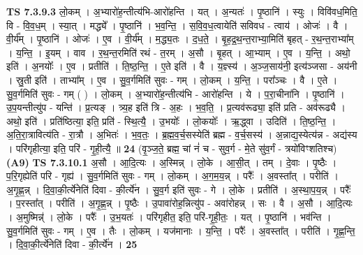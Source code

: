 \documentclass[17pt]{extarticle}
\begin{document}
                  \newline
                                \textbf{ TS 7.3.9.3} \newline
                  लो॒कम् । अ॒भ्यारो॑ह॒न्तीत्य॑भि-आरो॑हन्ति । यत् । अ॒न्यतः॑ । पृ॒ष्ठानि॑ । स्युः । विवि॑वध॒मिति॒ वि - वि॒व॒ध॒म् । स्या॒त् । मद्ध्ये᳚ । पृ॒ष्ठानि॑ । भ॒व॒न्ति॒ । स॒वि॒व॒ध॒त्वायेति॑ सविवध - त्वाय॑ । ओजः॑ । वै । वी॒र्य᳚म् । पृ॒ष्ठानि॑ । ओजः॑ । ए॒व । वी॒र्य᳚म् । म॒द्ध्य॒तः । द॒ध॒ते॒ । बृ॒ह॒द्र॒थ॒न्त॒राभ्या॒मिति॑ बृहत् - र॒थ॒न्त॒राभ्या᳚म् । य॒न्ति॒ । इ॒यम् । वाव । र॒थ॒न्त॒रमिति॑ रथं - त॒रम् । अ॒सौ । बृ॒हत् । आ॒भ्याम् । ए॒व । य॒न्ति॒ । अथो॒ इति॑ । अ॒नयोः᳚ । ए॒व । प्रतीति॑ । ति॒ष्ठ॒न्ति॒ । ए॒ते इति॑ । वै । य॒ज्ञ्स्य॑ । अ॒ञ्ज॒साय॑नी॒ इत्य॑ञ्जसा - अय॑नी । स्रु॒ती इति॑ । ताभ्या᳚म् । ए॒व । सु॒व॒र्गमिति॑ सुवः - गम् । लो॒कम् । य॒न्ति॒ । परा᳚ञ्चः । वै । ए॒ते । सु॒व॒र्गमिति॑ सुवः - गम् ( ) । लो॒कम् । अ॒भ्यारो॑ह॒न्तीत्य॑भि - आरो॑हन्ति । ये । प॒रा॒चीना॑नि । पृ॒ष्ठानि॑ । उ॒प॒यन्तीत्यु॑प - यन्ति॑ । प्र॒त्यङ् । त्र्य॒ह इति॑ त्रि - अ॒हः । भ॒व॒ति॒ । प्र॒त्यव॑रूढ्या॒ इति॑ प्रति - अव॑रूढ्यै । अथो॒ इति॑ । प्रति॑ष्ठित्या॒ इति॒ प्रति॑ - स्थि॒त्यै॒ । उ॒भयोः᳚ । लो॒कयोः᳚ । ऋ॒द्ध्वा । उदिति॑ । ति॒ष्ठ॒न्ति॒ । अ॒ति॒रा॒त्रावित्य॑ति - रा॒त्रौ । अ॒भितः॑ । भ॒व॒तः॒ । ब्र॒ह्म॒व॒र्च॒सस्येति॑ ब्रह्म - व॒र्च॒सस्य॑ । अ॒न्नाद्य॒स्येत्य॑न्न - अद्य॑स्य । परि॑गृहीत्या॒ इति॒ परि॑ - गृ॒ही॒त्यै॒ ॥ \textbf{  24 } \newline
                  \newline
                      (वृ॒ञ्ज॒ते॒ ब्रह्म॒ चां नं॑ च - सुव॒र्ग - मे॒ते सु॑व॒र्गं - त्रयो॑विꣳशतिश्च)  \textbf{(A9)} \newline \newline
                                \textbf{ TS 7.3.10.1} \newline
                  अ॒सौ । आ॒दि॒त्यः । अ॒स्मिन्न् । लो॒के । आ॒सी॒त् । तम् । दे॒वाः । पृ॒ष्ठैः । प॒रि॒गृह्येति॑ परि - गृह्य॑ । सु॒व॒र्गमिति॑ सुवः - गम् । लो॒कम् । अ॒ग॒म॒य॒न्न् । परैः᳚ । अ॒वस्ता᳚त् । परीति॑ । अ॒गृ॒ह्ण॒न्न् । दि॒वा॒की॒र्त्ये॑नेति॑ दिवा - की॒र्त्ये॑न । सु॒व॒र्ग इति॑ सुवः - गे । लो॒के । प्रतीति॑ । अ॒स्था॒प॒य॒न्न् । परैः᳚ । प॒रस्ता᳚त् । परीति॑ । अ॒गृ॒ह्ण॒न्न् । पृ॒ष्ठैः । उ॒पावा॑रोह॒न्नित्यु॑प - अवा॑रोहन्न् । सः । वै । अ॒सौ । आ॒दि॒त्यः । अ॒मुष्मिन्न्॑ । लो॒के । परैः᳚ । उ॒भ॒यतः॑ । परि॑गृहीत॒ इति॒ परि॑-गृ॒ही॒तः॒ । यत् । पृ॒ष्ठानि॑ । भव॑न्ति । सु॒व॒र्गमिति॑ सुवः - गम् । ए॒व । तैः । लो॒कम् । यज॑मानाः । य॒न्ति॒ । परैः᳚ । अ॒वस्ता᳚त् । परीति॑ । गृ॒ह्ण॒न्ति॒ । दि॒वा॒की॒र्त्ये॑नेति॑ दिवा - की॒र्त्ये॑न । \textbf{  25} \newline
                  \newline
\end{document}
